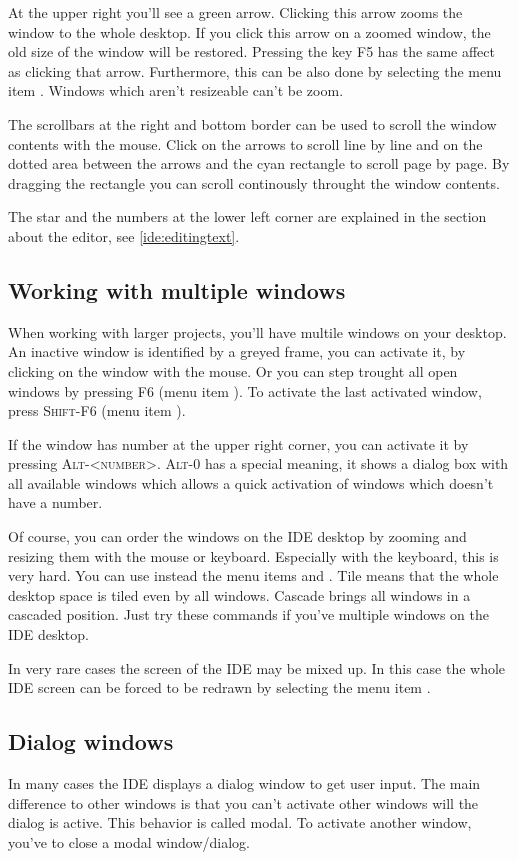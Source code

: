 At the upper right you'll see a green arrow. Clicking this arrow
zooms the window to the whole desktop. If you click this arrow on
a zoomed window, the old size of the window will be restored. Pressing
the key F5 has the same affect as clicking that arrow. Furthermore,
this can be also done by selecting the menu item .
Windows which aren't resizeable can't be zoom.

The scrollbars at the right and bottom border can be used to scroll
the window contents with the mouse. Click on the arrows to scroll
line by line and on the dotted area between the arrows and the cyan
rectangle to scroll page by page. By dragging the rectangle you can
scroll continously throught the window contents.

The star and the numbers at the lower left corner
are explained in the section about the editor, see \ref{ide:editingtext}.

\subsection{Working with multiple windows}
When working with larger projects, you'll have multile windows on your
desktop. An inactive window is identified by a greyed frame, you can
activate it, by clicking on the window with the mouse. Or you can
step trought all open windows by pressing \textsc{F6}
(menu item ).
To activate the last activated window, press \textsc{Shift-F6}
(menu item ).

If the window has number at the upper
right corner, you can activate it by pressing \textsc{Alt-<number>}.
\textsc{Alt-0} has a special meaning,
it shows a dialog box with all available
windows which allows a quick activation of windows which doesn't have a
number.

Of course, you can order the windows on the IDE desktop by zooming and
resizing them with the mouse or keyboard. Especially with the
keyboard, this is very hard. You can use instead the menu items
 and . Tile means that the
whole desktop space is tiled even by all windows. Cascade brings
all windows in a cascaded position. Just try these commands if you've
multiple windows on the IDE desktop.

In very rare cases the screen of the IDE may be mixed up. In this
case the whole IDE screen can be forced to be redrawn by selecting
the menu item .

\subsection{Dialog windows}
\label{ide:dialogwindow}
In many cases the IDE displays a dialog window to get user input.
The main difference to other windows is that you can't activate
other windows will the dialog is active. This behavior is called modal.
To activate another window, you've to close a modal window/dialog.

